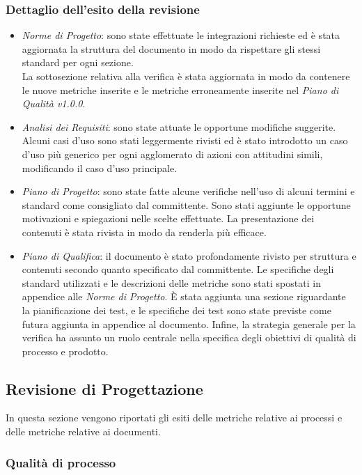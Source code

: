\subsubsection{Dettaglio dell'esito della revisione}
\begin{itemize}
	\item\emph{Norme di Progetto}: sono state effettuate le integrazioni richieste ed è stata aggiornata la struttura del documento in modo da rispettare gli stessi standard per ogni sezione.\\
	La sottosezione relativa alla verifica è stata aggiornata in modo da contenere le nuove metriche inserite e le metriche erroneamente inserite nel \emph{Piano di Qualità v1.0.0}.	\item\emph{Analisi dei Requisiti}: sono state attuate le opportune modifiche suggerite. Alcuni casi d'uso sono stati leggermente rivisti ed è stato introdotto un caso d'uso più generico per ogni agglomerato di azioni con attitudini simili, modificando il caso d'uso principale. 	
	\item\emph{Piano di Progetto}: sono state fatte alcune verifiche nell'uso di alcuni termini e standard come consigliato dal committente. Sono stati aggiunte le opportune motivazioni e spiegazioni nelle scelte effettuate. La presentazione dei contenuti è stata rivista in modo da renderla più efficace.
	\item\emph{Piano di Qualifica}: il documento è stato profondamente rivisto per struttura e contenuti secondo quanto specificato dal committente.
	Le specifiche degli standard utilizzati e le descrizioni delle metriche sono stati spostati in appendice alle \emph{Norme di Progetto}. È stata aggiunta una sezione riguardante la pianificazione dei test, e le specifiche dei test sono state previste come futura aggiunta in appendice al documento. Infine, la strategia generale per la verifica ha assunto un ruolo centrale nella specifica degli obiettivi di qualità di processo e prodotto. 
\end{itemize}

\subsection{Revisione di Progettazione}
In questa sezione vengono riportati gli esiti delle metriche relative ai processi e delle metriche relative ai documenti.

\subsubsection{Qualità di processo}

